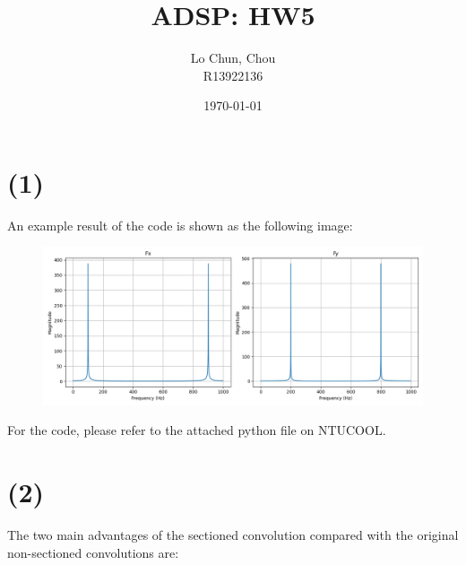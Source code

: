 \documentclass{article}
\title{ADSP: HW5}
\author{Lo Chun, Chou \\ R13922136}
\date\today
\begin{document}
\setlength{\parindent}{0pt}
\maketitle 



\section*{(1)}

An example result of the code is shown as the following image:

\begin{figure}[H]
    \centering
    \includegraphics[width=\textwidth]{problem_1/prob1_result.png}
\end{figure}

For the code, please refer to the attached python file  on NTUCOOL.

\section*{(2)}

The two main advantages of the sectioned convolution 
compared with the original non-sectioned convolutions are:
\end{document}
